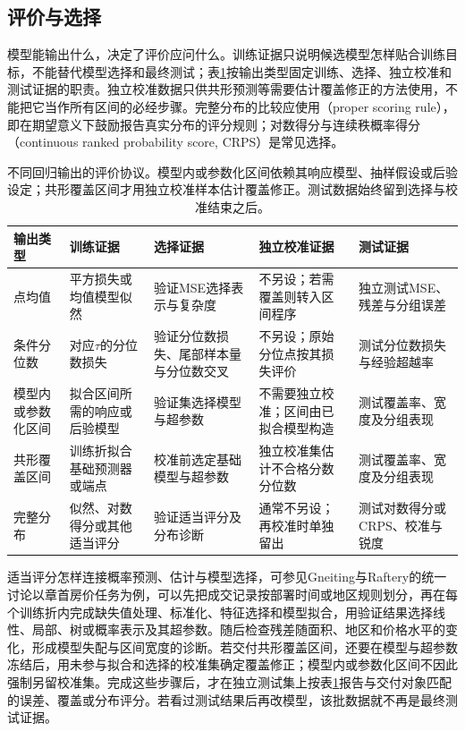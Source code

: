 \subsection{评价与选择}

模型能输出什么，决定了评价应问什么。训练证据只说明候选模型怎样贴合训练目标，不能替代模型选择和最终测试；表\ref{tab:regression-evaluation-protocol}按输出类型固定训练、选择、独立校准和测试证据的职责。独立校准数据只供共形预测等需要估计覆盖修正的方法使用，不能把它当作所有区间的必经步骤。完整分布的比较应使用（proper scoring rule），即在期望意义下鼓励报告真实分布的评分规则；对数得分与连续秩概率得分（continuous ranked probability score, CRPS）是常见选择。

\begin{table}[htbp]
  \centering
  \small
  \begin{tabularx}{\linewidth}{@{}>{\RaggedRight\arraybackslash}p{20mm}>{\RaggedRight\arraybackslash}X>{\RaggedRight\arraybackslash}X>{\RaggedRight\arraybackslash}X>{\RaggedRight\arraybackslash}X@{}}
    \toprule
    输出类型 & 训练证据 & 选择证据 & 独立校准证据 & 测试证据 \\
    \midrule
    点均值 & 平方损失或均值模型似然 & 验证MSE选择表示与复杂度 & 不另设；若需覆盖则转入区间程序 & 独立测试MSE、残差与分组误差 \\
    条件分位数 & 对应$\tau$的分位数损失 & 验证分位数损失、尾部样本量与分位数交叉 & 不另设；原始分位点按其损失评价 & 测试分位数损失与经验超越率 \\
    模型内或参数化区间 & 拟合区间所需的响应或后验模型 & 验证集选择模型与超参数 & 不需要独立校准；区间由已拟合模型构造 & 测试覆盖率、宽度及分组表现 \\
    共形覆盖区间 & 训练折拟合基础预测器或端点 & 校准前选定基础模型与超参数 & 独立校准集估计不合格分数分位数 & 测试覆盖率、宽度及分组表现 \\
    完整分布 & 似然、对数得分或其他适当评分 & 验证适当评分及分布诊断 & 通常不另设；再校准时单独留出 & 测试对数得分或CRPS、校准与锐度 \\
    \bottomrule
  \end{tabularx}
  \caption{不同回归输出的评价协议。模型内或参数化区间依赖其响应模型、抽样假设或后验设定；共形覆盖区间才用独立校准样本估计覆盖修正。测试数据始终留到选择与校准结束之后。}
  \label{tab:regression-evaluation-protocol}
\end{table}

适当评分怎样连接概率预测、估计与模型选择，可参见Gneiting与Raftery的统一讨论以章首房价任务为例，可以先把成交记录按部署时间或地区规则划分，再在每个训练折内完成缺失值处理、标准化、特征选择和模型拟合，用验证结果选择线性、局部、树或概率表示及其超参数。随后检查残差随面积、地区和价格水平的变化，形成模型失配与区间宽度的诊断。若交付共形覆盖区间，还要在模型与超参数冻结后，用未参与拟合和选择的校准集确定覆盖修正；模型内或参数化区间不因此强制另留校准集。完成这些步骤后，才在独立测试集上按表\ref{tab:regression-evaluation-protocol}报告与交付对象匹配的误差、覆盖或分布评分。若看过测试结果后再改模型，该批数据就不再是最终测试证据。

